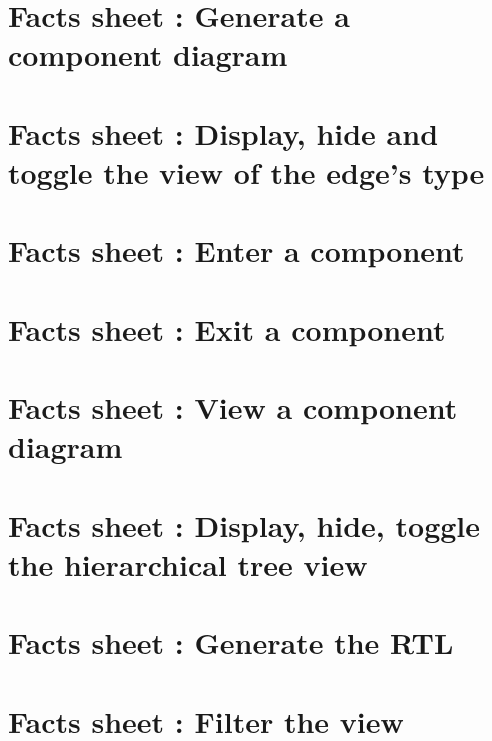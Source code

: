 \documentclass[a4paper,11pt]{report}
\begin{document}

\tableofcontents
\newpage









\printbibliography

\begin{appendices}

\chapter{Facts sheet : Generate a component diagram}


\chapter{Facts sheet : Display, hide and toggle the view of the edge's type}


\chapter{Facts sheet : Enter a component}


\chapter{Facts sheet : Exit a component}


\chapter{Facts sheet : View a component diagram}


\chapter{Facts sheet : Display, hide, toggle the hierarchical tree view}


\chapter{Facts sheet : Generate the RTL}


\chapter{Facts sheet : Filter the view}


\end{appendices}
\end{document}

